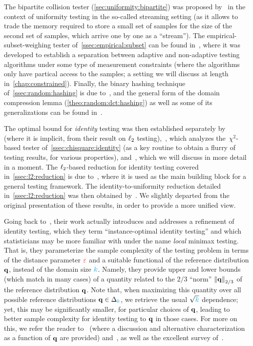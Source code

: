 The bipartite collision tester (\cref{sec:uniformity:bipartite}) was proposed by~\citet{DiakonikolasGKR19} in the context of uniformity testing in the so-called streaming setting (as it allows to trade the memory required to store a small set of samples for the size of the second set of samples, which arrive one by one as a ``stream''). The empirical-subset-weighing tester of~\cref{ssec:empirical:subset} can be found in~\citet{AcharyaCLST21}, where it was developed to establish a separation between adaptive and non-adaptive testing algorithms under some type of measurement constraints (where the algorithms only have partical access to the samples; a setting we will discuss at length in~\cref{chap:constrained}). 
Finally, the binary hashing technique of~\cref{ssec:random:hashing} is due to~\citet{AcharyaCT19b}, and the general form of the domain compression lemma (\cref{theo:random:dct:hashing}) as well as some of its generalizations can be found in~\citet{AcharyaCT19b,AcharyaCHST20,AminJM20}.\medskip


The optimal bound for \emph{identity} testing was then established separately by~\citet{ChanDVV14} (where it is implicit, from their result on $\lp[2]$ testing),~\citep{AcharyaDK15}, which analyzes the~$\chi^2$-based tester of~\cref{ssec:chisquare:identity} (as a key routine to obtain a flurry of testing results, for various properties), and~\citet{ValiantV17}, which we will discuss in more detail in a moment.
The $\lp[2]$-based reduction for identity testing covered in~\cref{ssec:l2:reduction} is due to~\citet{DiakonikolasK16}, where it is used as the main building block for a general testing framework. The identity-to-uniformity reduction detailed in~\cref{ssec:l2:reduction} was then obtained by~\citet{Goldreich16}. We slightly departed from the original presentation of these results, in order to provide a more unified view.

Going back to~\citet{ValiantV17}, their work actually introduces and addresses a refinement of identity testing, which they term ``instance-optimal identity testing'' and which statisticians may be more familiar with under the name \emph{local} minimax testing. That is, they parameterize the sample complexity of the testing problem in terms of the distance parameter $\dst$ and a suitable functional of the reference distribution $\q$, instead of the domain size $\ab$. Namely, they provide upper and lower bounds (which match in many cases) of a quantity related to the $2/3$ ``norm'' $\norm{\q}_{2/3}$ of the reference distribution $\q$. Note that, when maximizing this quantity over all possible reference distributions $\q\in\distribs{\ab}$, we retrieve the usual $\sqrt{\ab}$ dependence; yet, this may be significantly smaller, for particular choices of $\q$, leading to better sample complexity for identity testing to $\q$ in those cases. For more on this, we refer the reader to~\citet{BlaisCG19} (where a discussion and alternative characterization as a function of $\q$ are provided) and~\citet{DiakonikolasK16}, as well as the excellent survey of~\citet{BalakrishnanW18}.\medskip

